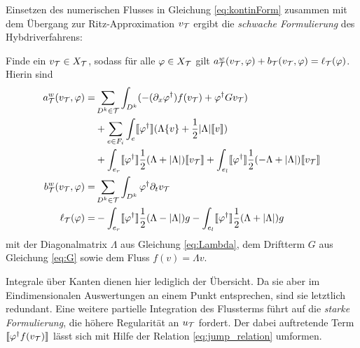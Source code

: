 Einsetzen des numerischen Flusses in Gleichung \eqref{eq:kontinForm} zusammen mit dem Übergang zur Ritz-Approximation $v_{\mathcal{T}}$ ergibt die \emph{schwache Formulierung} des Hybdriverfahrens:
\begin{problem}
  \label{prob:weak}
  Finde ein ${v_{\mathcal{T}}\in X_{\mathcal{T}}}$, sodass für alle $\varphi\in X_{\mathcal{T}}$ gilt $a_{\mathcal{T}}^w(v_{\mathcal{T}}, \varphi) + b_{\mathcal{T}}(v_{\mathcal{T}}, \varphi) = \ell_{\mathcal{T}}(\varphi)$. Hierin sind
  \begin{align}
    a_{\mathcal{T}}^w(v_{\mathcal{T}}, \varphi) = &\sum_{D^k\in\mathcal{T}}\int_{D^k} ( - (\partial_x \varphi^{\dagger}) f(v_{\mathcal{T}}) + \varphi^{\dagger} G v_{\mathcal{T}}) \nonumber \\
    &+ \sum_{e\in F_i}\int_{e}\llbracket \varphi^{\dagger} \rrbracket (\Lambda\{ v \} + \frac{1}{2}|\Lambda|\llbracket v \rrbracket) \\
    &+ \int_{e_r} \llbracket \varphi^{\dagger} \rrbracket \frac{1}{2}(\Lambda + |\Lambda|)\llbracket v_{\mathcal{T}} \rrbracket
    + \int_{e_l} \llbracket \varphi^{\dagger} \rrbracket \frac{1}{2}(-\Lambda + |\Lambda|)\llbracket v_{\mathcal{T}} \rrbracket \nonumber \\
    b_{\mathcal{T}}^w(v_{\mathcal{T}}, \varphi) = &\sum_{D^k\in\mathcal{T}}\int_{D^k} \varphi^{\dagger} \partial_t v_{\mathcal{T}} \\
    \ell_{\mathcal{T}}(\varphi)  = &-\int_{e_r} \llbracket \varphi^{\dagger} \rrbracket \frac{1}{2}(\Lambda - |\Lambda|)g
      -\int_{e_l} \llbracket \varphi^{\dagger} \rrbracket \frac{1}{2}(\Lambda + |\Lambda|)g
  \end{align}
  mit der Diagonalmatrix $\Lambda$ aus Gleichung \eqref{eq:Lambda}, dem Driftterm $G$ aus Gleichung \eqref{eq:G} sowie dem Fluss ${f(v)=\Lambda v}$.
\end{problem}
Integrale über Kanten dienen hier lediglich der Übersicht. Da sie aber im Eindimensionalen Auswertungen an einem Punkt entsprechen, sind sie letztlich redundant. Eine weitere partielle Integration des Flussterms führt auf die \emph{starke Formulierung}, die höhere Regularität an $u_{\mathcal{T}}$ fordert. Der dabei auftretende Term $\llbracket \varphi^{\dagger}f(v_{\mathcal{T}}) \rrbracket$ lässt sich mit Hilfe der Relation \eqref{eq:jump_relation} umformen.
